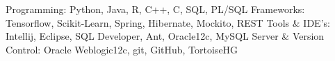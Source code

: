\begin{cvskills}
  \cvskill
    {Programming:}
    {Python, Java, R, C++, C, SQL, PL/SQL}
  \cvskill
    {Frameworks:}
    {Tensorflow, Scikit-Learn, Spring, Hibernate, Mockito, REST}
  \cvskill
    {Tools \& IDE's:}
    {Intellij, Eclipse, SQL Developer, Ant, Oracle12c, MySQL}
  \cvskill
    {Server \& Version Control:}
    {Oracle Weblogic12c, git, GitHub, TortoiseHG}
\end{cvskills}